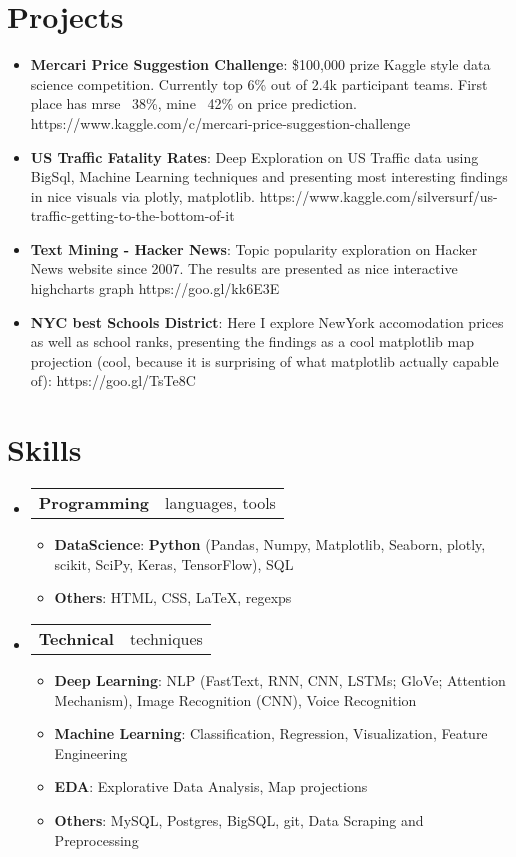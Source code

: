\documentclass[letterpaper,11pt]{article}
\makeatletter
\newcommand{\resumeItem}[2]{
  \item\small{
    \textbf{#1}{: #2 \vspace{-2pt}}
  }
}
\newcommand{\skillsSubheading}[2]{
  \vspace{-1pt}\item
    \begin{tabular*}{0.97\textwidth}{l@{\extracolsep{\fill}}r}
      \textbf{#1} & #2
    \end{tabular*}\vspace{-7pt}
}
\newcommand{\resumeSubItem}[2]{\resumeItem{#1}{#2}\vspace{-4pt}}
\newcommand{\resumeSubHeadingListStart}{\begin{itemize}[leftmargin=*]}
\newcommand{\resumeSubHeadingListEnd}{\end{itemize}}
\newcommand{\resumeItemListStart}{\begin{itemize}}
\newcommand{\resumeItemListEnd}{\end{itemize}\vspace{-5pt}}
\makeatother
\begin{document}
\section{Projects}
  \resumeSubHeadingListStart
    \resumeSubItem{Mercari Price Suggestion Challenge}
      {\$100,000 prize Kaggle style data science competition. Currently top 6\% out of 2.4k participant teams. First place has mrse ~38\%, mine ~42\% on price prediction. https://www.kaggle.com/c/mercari-price-suggestion-challenge}
    \resumeSubItem{US Traffic Fatality Rates}
      {Deep Exploration on US Traffic data using BigSql, Machine Learning techniques and presenting most interesting findings in nice visuals via plotly, matplotlib. https://www.kaggle.com/silversurf/us-traffic-getting-to-the-bottom-of-it}
    \resumeSubItem{Text Mining - Hacker News}
      {Topic popularity exploration on Hacker News website since 2007. The results are presented as nice interactive highcharts graph https://goo.gl/kk6E3E}
    \resumeSubItem{NYC best Schools District}
      {Here I explore NewYork accomodation prices as well as school ranks, presenting the findings as a cool matplotlib map projection (cool, because it is surprising of what matplotlib actually capable of): https://goo.gl/TsTe8C}
  \resumeSubHeadingListEnd


\section{Skills}
 \resumeSubHeadingListStart
  \skillsSubheading
    {Programming}{languages, tools}
    \resumeItemListStart
      \resumeItem{DataScience}
        {\textbf{Python} (Pandas, Numpy, Matplotlib, Seaborn, plotly, scikit, SciPy, Keras, TensorFlow), SQL}
      \resumeItem{Others}
        {HTML, CSS, LaTeX, regexps}
    \resumeItemListEnd
  \skillsSubheading
    {Technical}{techniques}
    \resumeItemListStart
      \resumeItem{Deep Learning}
        {NLP (FastText, RNN, CNN, LSTMs; GloVe; Attention Mechanism), Image Recognition (CNN), Voice Recognition}
      \resumeItem{Machine Learning}
        {Classification, Regression, Visualization, Feature Engineering}
      \resumeItem{EDA}
        {Explorative Data Analysis, Map projections}
      \resumeItem{Others}
        {MySQL, Postgres, BigSQL, git, Data Scraping and Preprocessing}
    \resumeItemListEnd
 \resumeSubHeadingListEnd
\end{document}
